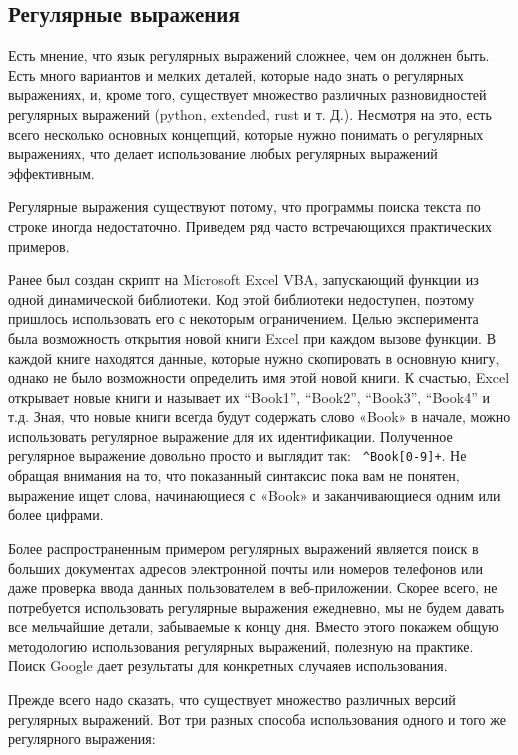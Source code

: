 \documentclass{article}
\begin{document}
\hypertarget{Regular-Expressions}{%
\subsection{\texorpdfstring{\protect\hyperlink{Regular-Expressions}{}Регулярные
выражения}{Регулярные выражения}}\label{Regular-Expressions}}

Есть мнение, что язык регулярных выражений сложнее, чем он должнен быть.
Есть много вариантов и мелких деталей, которые надо знать о регулярных
выражениях, и, кроме того, существует множество различных разновидностей
регулярных выражений (python, extended, rust и т. Д.). Несмотря на это,
есть всего несколько основных концепций, которые нужно понимать о
регулярных выражениях, что делает использование любых регулярных
выражений эффективным.

Регулярные выражения существуют потому, что программы поиска текста по
строке иногда недостаточно. Приведем ряд часто встречающихся
практических примеров.

Ранее был создан скрипт на Microsoft Excel VBA, запускающий функции из
одной динамической библиотеки. Код этой библиотеки недоступен, поэтому
пришлось использовать его с некоторым ограничением. Целью эксперимента
была возможность открытия новой книги Excel при каждом вызове функции. В
каждой книге находятся данные, которые нужно скопировать в основную
книгу, однако не было возможности определить имя этой новой книги. К
счастью, Excel открывает новые книги и называет их ``Book1'', ``Book2'',
``Book3'', ``Book4'' и т.д. Зная, что новые книги всегда будут содержать
слово «Book» в начале, можно использовать регулярное выражение для их
идентификации. Полученное регулярное выражение довольно просто и
выглядит так: \texttt{\ \^{}Book{[}0-9{]}+}. Не обращая внимания на то,
что показанный синтаксис пока вам не понятен, выражение ищет слова,
начинающиеся с «Book» и заканчивающиеся одним или более цифрами.

Более распространенным примером регулярных выражений является поиск в
больших документах адресов электронной почты или номеров телефонов или
даже проверка ввода данных пользователем в веб-приложении. Скорее всего,
не потребуется использовать регулярные выражения ежедневно, мы не будем
давать все мельчайшие детали, забываемые к концу дня. Вместо этого
покажем общую методологию использования регулярных выражений, полезную
на практике. Поиск Google дает результаты для конкретных случаяев
использования.

Прежде всего надо сказать, что существует множество различных версий
регулярных выражений. Вот три разных способа использования одного и того
же регулярного выражения:
\end{document}
